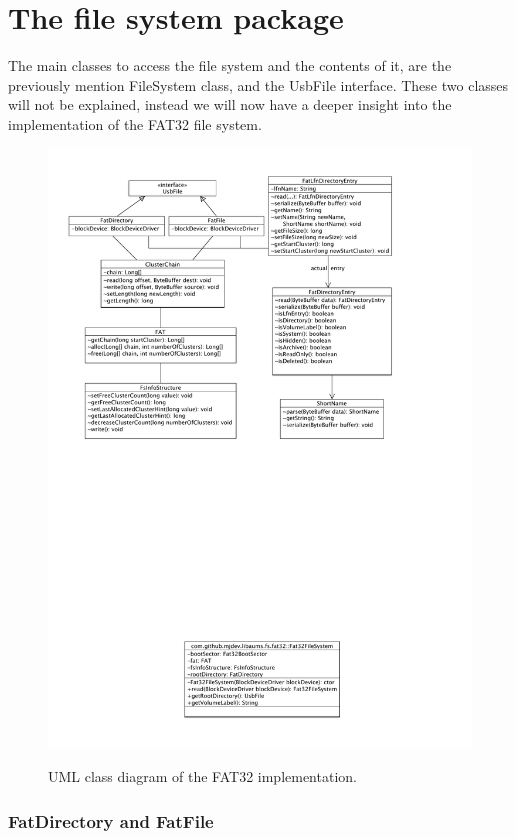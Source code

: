 \section{The file system package}

The main classes to access the file system and the contents of it, are the previously mention FileSystem class, and the UsbFile interface. These two classes will not be explained, instead we will now have a deeper insight into the implementation of the FAT32 file system.

\begin{figure}[h!]
\caption{UML class diagram of the FAT32 implementation.}
\centering
\includegraphics[scale=1.0]{figures/fat_package}
\label{figure:fat_package}
\end{figure}

\subsubsection{FatDirectory and FatFile}

